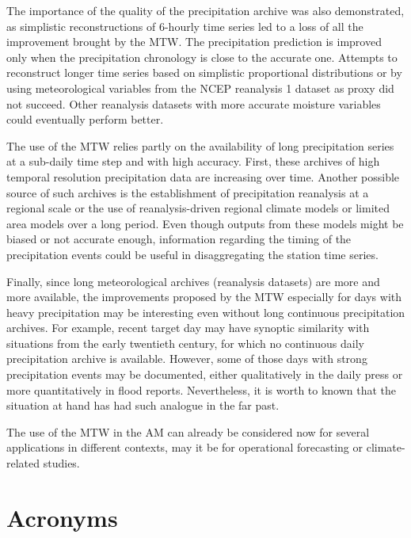 \documentclass[hess, manuscript]{copernicus}
\begin{document}
	The importance of the quality of the precipitation archive was also demonstrated, as simplistic reconstructions of 6-hourly time series led to a loss of all the improvement brought by the MTW. The precipitation prediction is improved only when the precipitation chronology is close to the accurate one. Attempts to reconstruct longer time series based on simplistic proportional distributions or by using meteorological variables from the NCEP reanalysis 1 dataset as proxy did not succeed. Other reanalysis datasets with more accurate moisture variables could eventually perform better.
	
	The use of the MTW relies partly on the availability of long precipitation series at a sub-daily time step and with high accuracy. First, these archives of high temporal resolution precipitation data are increasing over time. Another possible source of such archives is the establishment of precipitation reanalysis at a regional scale or the use of reanalysis-driven regional climate models or limited area models over a long period. Even though outputs from these models might be biased or not accurate enough, information regarding the timing of the precipitation events could be useful in disaggregating the station time series.
	
	Finally, since long meteorological archives (reanalysis datasets) are more and more available, the improvements proposed by the MTW especially for days with heavy precipitation may be interesting even without long continuous precipitation archives. For example, recent target day may have synoptic similarity with situations from the early twentieth century, for which no continuous daily precipitation archive is available. However, some of those days with strong precipitation events may be documented, either qualitatively in the daily press or more quantitatively in flood reports. Nevertheless, it is worth to known that the situation at hand has had such analogue in the far past.
	
	The use of the MTW in the AM can already be considered now for several applications in different contexts, may it be for operational forecasting or climate-related studies.
	
	
	\appendix
	\section{Acronyms}    %
	
\end{document}
